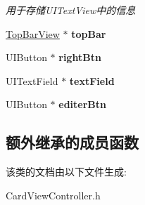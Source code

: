 \begin{DoxyCompactItemize}
\begin{DoxyCompactList}\small\item\em 用于存储\-U\-I\-Text\-View中的信息 \end{DoxyCompactList}\item 
\hypertarget{interface_card_view_controller_ab1c90ae754040fa90d1f7ad719aafcd4}{\hyperlink{interface_top_bar_view}{Top\-Bar\-View} $\ast$ {\bfseries top\-Bar}}\label{interface_card_view_controller_ab1c90ae754040fa90d1f7ad719aafcd4}

\item 
\hypertarget{interface_card_view_controller_aac253889610bf91cc6d69aa9473f703c}{U\-I\-Button $\ast$ {\bfseries right\-Btn}}\label{interface_card_view_controller_aac253889610bf91cc6d69aa9473f703c}

\item 
\hypertarget{interface_card_view_controller_a61e36edcbbe84a6c381437a948a23796}{U\-I\-Text\-Field $\ast$ {\bfseries text\-Field}}\label{interface_card_view_controller_a61e36edcbbe84a6c381437a948a23796}

\item 
\hypertarget{interface_card_view_controller_acd7402f25949d6d7f697df45f8cd1787}{U\-I\-Button $\ast$ {\bfseries editer\-Btn}}\label{interface_card_view_controller_acd7402f25949d6d7f697df45f8cd1787}

\end{DoxyCompactItemize}
\subsection*{额外继承的成员函数}


该类的文档由以下文件生成\-:\begin{DoxyCompactItemize}
\item 
Card\-View\-Controller.\-h\end{DoxyCompactItemize}
